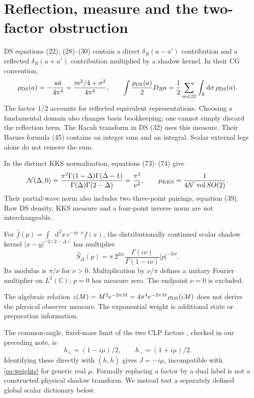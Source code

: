 \documentclass[11pt,a4paper]{article}
\newcommand{\dd}{\mathop{}\!\mathrm d}
\newcommand{\C}{\mathbb C}
\newcommand{\R}{\mathbb R}
\begin{document}
\newpage
\section{Reflection, measure and the two-factor obstruction}
DS equations (22), (28)--(30) contain a direct
$\delta_R(a-a')$ contribution and a reflected $\delta_R(a+a')$
contribution multiplied by a shadow kernel. In their CG convention,
\begin{equation}
 \rho_{\rm DS}(a)=-\frac{a\bar a}{4\pi^4}
 =\frac{m^2/4+\sigma^2}{4\pi^4},\qquad
 \int\frac{\rho_{\rm DS}(a)}2D_Ra
 =\frac12\sum_{m\in2\mathbb Z}\int_{\R}\dd\sigma\,\rho_{\rm DS}(a).
\end{equation}
The factor $1/2$ accounts for reflected equivalent representations.
Choosing a fundamental domain also changes basis bookkeeping;
one cannot simply discard the reflection term. The Racah transform
in DS (32) uses this measure. Their Barnes formula (45) contains
an integer sum and an integral. Scalar external legs alone do not
remove the sum.

In the distinct KKS normalization, equations (73)--(74) give
\begin{equation}
 \mathcal N(\Delta,0)=
 \frac{\pi^2\Gamma(1-\Delta)\Gamma(\Delta-1)}
 {\Gamma(\Delta)\Gamma(2-\Delta)}
 =\frac{\pi^2}{\nu^2},\qquad
 \mu_{\rm KKS}=\frac{1}{4\mathcal N\,\operatorname{vol}SO(2)}.
\end{equation}
Their partial-wave norm also includes two three-point pairings,
equation (39). Raw DS density, KKS measure and a four-point inverse
norm are not interchangeable.

For $\widehat f(p)=\int\dd^2x\,e^{-ip\cdot x}f(x)$, the
distributionally continued scalar shadow kernel
$|x-y|^{-2(2-\Delta)}$ has multiplier
\begin{equation}
 \widehat S_\Delta(p)=
 \pi\,2^{2i\nu}\frac{\Gamma(i\nu)}{\Gamma(1-i\nu)}|p|^{-2i\nu}.
\end{equation}
Its modulus is $\pi/\nu$ for $\nu>0$. Multiplication by $\nu/\pi$
defines a unitary Fourier multiplier on $L^2(\C)$; $p=0$
has measure zero. The endpoint $\nu=0$ is excluded.

The algebraic relation
$z(M)=M^2e^{-2\pi M}=4\pi^4e^{-2\pi M}\rho_{\rm DS}(iM)$
does not derive the physical observer measure. The exponential
weight is additional state or preparation information.

The common-angle, fixed-mass limit of the two CLP factors
\cite{clp}, checked in our preceding note, is
\begin{equation}
 h_+=(1-i\mu)/2,\qquad h_-=(1+i\mu)/2.
\end{equation}
Identifying these directly with $(h,\bar h)$ gives
$J=-i\mu$, incompatible with \eqref{eq:weights} for generic real
$\mu$. Formally replacing a factor by a dual label is not a
constructed physical shadow transform. We instead test a separately
defined global scalar dictionary below.
\end{document}
